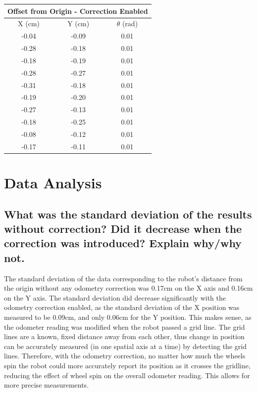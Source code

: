 \documentclass[11pt]{article} %
\begin{document}
\begin{center}
\begin{tabular}{ | c | c | c | }
\multicolumn{3}{c}{Offset from Origin - Correction Enabled} \\ \hline
X (cm) & Y (cm) & $\theta$ (rad)\\ \hline
-0.04 & -0.09 & 0.01 \\ \hline
-0.28 & -0.18 & 0.01 \\ \hline
-0.18 & -0.19 & 0.01 \\ \hline
-0.28 & -0.27 & 0.01 \\ \hline
-0.31 & -0.18 & 0.01 \\ \hline
-0.19 & -0.20 & 0.01 \\ \hline
-0.27 & -0.13 & 0.01 \\ \hline
-0.18 & -0.25 & 0.01 \\ \hline
-0.08 & -0.12 & 0.01 \\ \hline
-0.17 & -0.11 & 0.01 \\ \hline
\end{tabular}
\end{center}

\section{Data Analysis}
\subsection{What was the standard deviation of the results without correction? Did it decrease when
the correction was introduced? Explain why/why not.}
The standard deviation of the data corresponding to the robot's distance from the origin without any
odometry correction was 0.17cm on the X axis and 0.16cm on the Y axis. The standard deviation did
decrease significantly with the odometry correction enabled, as the standard deviation of the X
position was measured to be 0.09cm, and only 0.06cm for the Y position. This makes sense, as the
odometer reading was modified when the robot passed a grid line. The grid lines are a known, fixed
distance away from each other, thus change in position can be accurately measured (in one spatial
axis at a time) by detecting the grid lines. Therefore, with the odometry correction, no matter how
much the wheels spin the robot could more accurately report its position as it crosses the gridline,
reducing the effect of wheel spin on the overall odometer reading. This allows for more precise
measurements.
\end{document}
